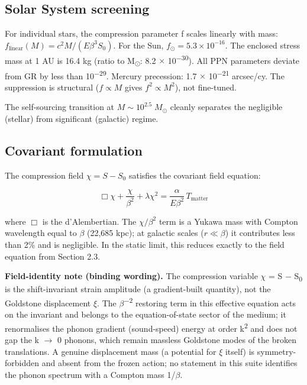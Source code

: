 \documentclass[11pt,a4paper]{article}
\begin{document}
\subsection{Solar System screening}
For individual stars, the compression parameter f scales linearly with mass: \(f_{\mathrm{linear}}(M) = c^2 M / (E\beta^3 S_0)\). For the Sun, \(f_\odot = 5.3 \times 10^{-16}\). The enclosed stress mass at 1 AU is 16.4 kg (ratio to M\textsubscript{$\odot$}: 8.2 $\times$ 10\textsuperscript{$-$30}). All PPN parameters deviate from GR by less than 10\textsuperscript{$-$29}. Mercury precession: 1.7 $\times$ 10\textsuperscript{$-$21} arcsec/\allowbreak{}cy. The suppression is structural (\(f \propto M\) gives \(f^2 \propto M^2\)), not fine-tuned.

The self-sourcing transition at \(M \sim 10^{2.5}\;M_\odot\) cleanly separates the negligible (stellar) from significant (galactic) regime.

\subsection{Covariant formulation}
The compression field \(\chi = S - S_0\) satisfies the covariant field equation:

\[ \Box\chi + \frac{\chi}{\beta^2} + \lambda\chi^2 = \frac{\alpha}{E\beta^2}\,T_{\mathrm{matter}} \]

where \(\Box\) is the d'Alembertian. The \(\chi/\beta^2\) term is a Yukawa mass with Compton wavelength equal to $\beta$ (22,685 kpc); at galactic scales (\(r \ll \beta\)) it contributes less than 2\% and is negligible. In the static limit, this reduces exactly to the field equation from Section 2.3.

\begin{mdframed}[linecolor=accent,linewidth=0.5pt,backgroundcolor=callout-bg,leftline=true,rightline=true,topline=true,bottomline=true,innerleftmargin=8pt,innerrightmargin=8pt,innertopmargin=6pt,innerbottommargin=6pt]
\textbf{Field-identity note (binding wording).} The compression variable $\chi$ = S $-$ S\textsubscript{0} is the shift-invariant strain amplitude (a gradient-built quantity), not the Goldstone displacement $\xi$. The $\beta$\textsuperscript{$-$2} restoring term in this effective equation acts on the invariant and belongs to the equation-of-state sector of the medium; it renormalises the phonon gradient (sound-speed) energy at order k\textsuperscript{2} and does not gap the k $\rightarrow$ 0 phonons, which remain massless Goldstone modes of the broken translations. A genuine displacement mass (a potential for $\xi$ itself) is symmetry-forbidden and absent from the frozen action; no statement in this suite identifies the phonon spectrum with a Compton mass 1/\allowbreak{}$\beta$.
\end{mdframed}
\end{document}
